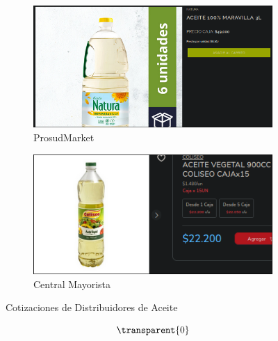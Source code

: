 \documentclass[12pt]{article}
\begin{document}
        \begin{figure}[h!] %
            \centering
            \begin{subfigure}{0.45\textwidth}
                \centering
                \includegraphics[width=0.9\linewidth]{prosud} %
                \caption{ProsudMarket}
                \label{fig:prosudmarket}
            \end{subfigure}
            \hfill
            \begin{subfigure}{0.45\textwidth}
                \centering
                \includegraphics[width=0.9\linewidth]{aceite} %
                \caption{Central Mayorista}
                \label{fig:central_mayorista_aceite}
            \end{subfigure}
            \caption{Cotizaciones de Distribuidores de Aceite}
            \label{fig:cotizaciones_aceite}
        \end{figure} %
        
        \newpage %
        \[\transparent{0}\]
\end{document}

